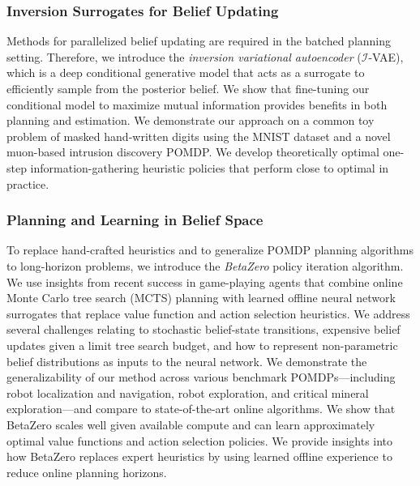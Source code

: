 \subsubsection{Inversion Surrogates for Belief Updating}
Methods for parallelized belief updating are required in the batched planning setting.
Therefore, we introduce the \textit{inversion variational autoencoder} ($\mathcal{I}$-VAE), which is a deep conditional generative model that acts as a surrogate to efficiently sample from the posterior belief.
We show that fine-tuning our conditional model to maximize mutual information provides benefits in both planning and estimation.
We demonstrate our approach on a common toy problem of masked hand-written digits using the MNIST dataset \cite{lecun1998gradient} and a novel muon-based intrusion discovery POMDP.
We develop theoretically optimal one-step information-gathering heuristic policies that perform close to optimal in practice.

\subsubsection{Planning and Learning in Belief Space}
To replace hand-crafted heuristics and to generalize POMDP planning algorithms to long-horizon problems, we introduce the \textit{BetaZero} policy iteration algorithm.
We use insights from recent success in game-playing agents \cite{silver2018general} that combine online Monte Carlo tree search (MCTS) planning with learned offline neural network surrogates that replace value function and action selection heuristics.
We address several challenges relating to stochastic belief-state transitions, expensive belief updates given a limit tree search budget, and how to represent non-parametric belief distributions as inputs to the neural network.
We demonstrate the generalizability of our method across various benchmark POMDPs---including robot localization and navigation, robot exploration, and critical mineral exploration---and compare to state-of-the-art online algorithms.
We show that BetaZero scales well given available compute and can learn approximately optimal value functions and action selection policies.
We provide insights into how BetaZero replaces expert heuristics by using learned offline experience to reduce online planning horizons.


